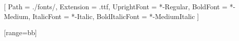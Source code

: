 \usepackage{fontspec}

\setmonofont{IBMPlexMono}[
	Path = ./fonts/,
	Extension = .ttf,
	UprightFont = *-Regular,
	BoldFont = *-Medium,
	ItalicFont = *-Italic,
  BoldItalicFont = *-MediumItalic
]

\usepackage{float}
\usepackage{booktabs}
\usepackage{mathtools}
\hypersetup{colorlinks=true,allcolors=blue}

[range=bb]
